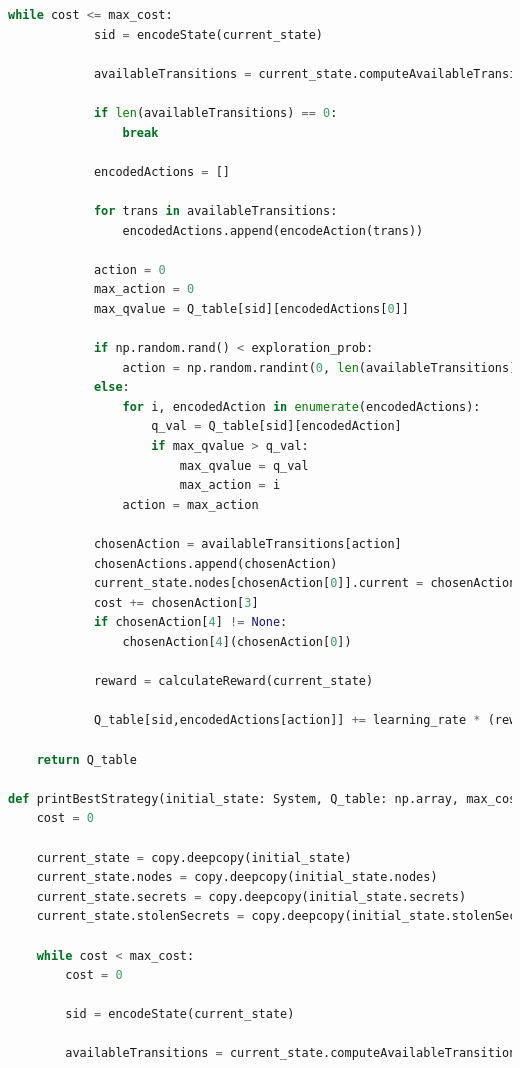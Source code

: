 \documentclass[a4paper]{article}
\begin{document}
\begin{appendices}
\begin{lstlisting}[language=python]
        while cost <= max_cost:        
            sid = encodeState(current_state)

            availableTransitions = current_state.computeAvailableTransitions()
            
            if len(availableTransitions) == 0:
                break

            encodedActions = []

            for trans in availableTransitions:
                encodedActions.append(encodeAction(trans))

            action = 0
            max_action = 0
            max_qvalue = Q_table[sid][encodedActions[0]]

            if np.random.rand() < exploration_prob:
                action = np.random.randint(0, len(availableTransitions))
            else:
                for i, encodedAction in enumerate(encodedActions):
                    q_val = Q_table[sid][encodedAction]
                    if max_qvalue > q_val:
                        max_qvalue = q_val 
                        max_action = i
                action = max_action
            
            chosenAction = availableTransitions[action]
            chosenActions.append(chosenAction)
            current_state.nodes[chosenAction[0]].current = chosenAction[2]
            cost += chosenAction[3]
            if chosenAction[4] != None:
                chosenAction[4](chosenAction[0])

            reward = calculateReward(current_state)

            Q_table[sid,encodedActions[action]] += learning_rate * (reward + discount_factor * np.max(Q_table[encodeState(current_state)]) - Q_table[sid,encodedActions[action]])

    return Q_table

def printBestStrategy(initial_state: System, Q_table: np.array, max_cost: int = 150):
    cost = 0

    current_state = copy.deepcopy(initial_state)
    current_state.nodes = copy.deepcopy(initial_state.nodes)
    current_state.secrets = copy.deepcopy(initial_state.secrets)
    current_state.stolenSecrets = copy.deepcopy(initial_state.stolenSecrets)

    while cost < max_cost:
        cost = 0

        sid = encodeState(current_state)

        availableTransitions = current_state.computeAvailableTransitions()


\end{lstlisting}
\end{appendices}
\end{document}
